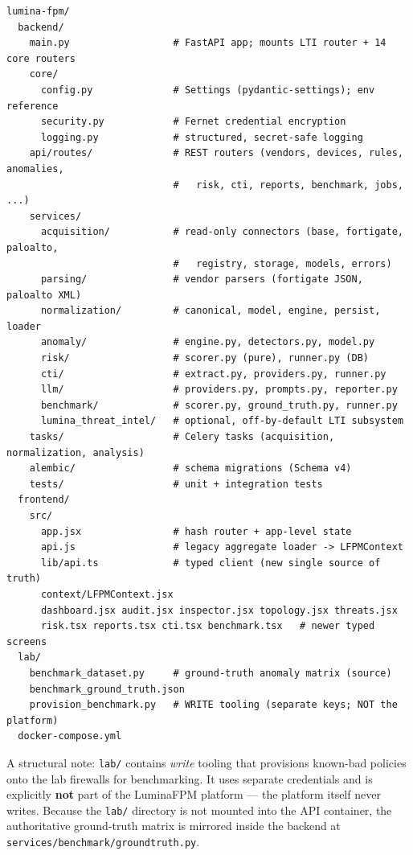 \documentclass[12pt,a4paper]{report}
\renewcommand{\_}{\textunderscore\allowbreak}
\begin{document}
\begin{lstlisting}[caption={LuminaFPM repository structure (abridged).},label={lst:ch4-tree}]
lumina-fpm/
  backend/
    main.py                  # FastAPI app; mounts LTI router + 14 core routers
    core/
      config.py              # Settings (pydantic-settings); env reference
      security.py            # Fernet credential encryption
      logging.py             # structured, secret-safe logging
    api/routes/              # REST routers (vendors, devices, rules, anomalies,
                             #   risk, cti, reports, benchmark, jobs, ...)
    services/
      acquisition/           # read-only connectors (base, fortigate, paloalto,
                             #   registry, storage, models, errors)
      parsing/               # vendor parsers (fortigate JSON, paloalto XML)
      normalization/         # canonical, model, engine, persist, loader
      anomaly/               # engine.py, detectors.py, model.py
      risk/                  # scorer.py (pure), runner.py (DB)
      cti/                   # extract.py, providers.py, runner.py
      llm/                   # providers.py, prompts.py, reporter.py
      benchmark/             # scorer.py, ground_truth.py, runner.py
      lumina_threat_intel/   # optional, off-by-default LTI subsystem
    tasks/                   # Celery tasks (acquisition, normalization, analysis)
    alembic/                 # schema migrations (Schema v4)
    tests/                   # unit + integration tests
  frontend/
    src/
      app.jsx                # hash router + app-level state
      api.js                 # legacy aggregate loader -> LFPMContext
      lib/api.ts             # typed client (new single source of truth)
      context/LFPMContext.jsx
      dashboard.jsx audit.jsx inspector.jsx topology.jsx threats.jsx
      risk.tsx reports.tsx cti.tsx benchmark.tsx   # newer typed screens
  lab/
    benchmark_dataset.py     # ground-truth anomaly matrix (source)
    benchmark_ground_truth.json
    provision_benchmark.py   # WRITE tooling (separate keys; NOT the platform)
  docker-compose.yml
\end{lstlisting}

A structural note: \texttt{lab/} contains \emph{write} tooling that provisions known-bad policies onto the lab firewalls for benchmarking. It uses separate credentials and is explicitly \textbf{not} part of the LuminaFPM platform --- the platform itself never writes. Because the \texttt{lab/} directory is not mounted into the API container, the authoritative ground-truth matrix is mirrored inside the backend at \texttt{services/benchmark/ground\_truth.py}.
\end{document}
